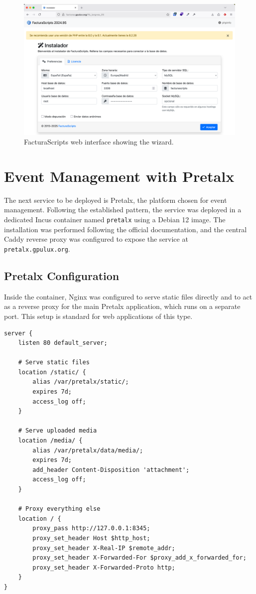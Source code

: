 \begin{figure}[H]
	\centering
	\includegraphics[width=\textwidth]{imaxes/facturascripts-wizard.png}
	\caption{FacturaScripts web interface showing the wizard.}
	\label{fig:facturascripts-wizard}
\end{figure}

\section{Event Management with Pretalx}

The next service to be deployed is Pretalx, the platform chosen for event management. Following the established pattern, the service was deployed in a dedicated Incus container named \texttt{pretalx} using a Debian 12 image. The installation was performed following the official documentation\cite{pretalx-install}, and the central Caddy reverse proxy was configured to expose the service at \texttt{pretalx.gpulux.org}.

\subsection*{Pretalx Configuration}

Inside the container, Nginx was configured to serve static files directly and to act as a reverse proxy for the main Pretalx application, which runs on a separate port. This setup is standard for web applications of this type.

\begin{lstlisting}[caption={Pretalx Nginx configuration to proxy the application and serve static files.}]
server {
    listen 80 default_server;

    # Serve static files
    location /static/ {
        alias /var/pretalx/static/;
        expires 7d;
        access_log off;
    }

    # Serve uploaded media
    location /media/ {
        alias /var/pretalx/data/media/;
        expires 7d;
        add_header Content-Disposition 'attachment';
        access_log off;
    }

    # Proxy everything else
    location / {
        proxy_pass http://127.0.0.1:8345;
        proxy_set_header Host $http_host;
        proxy_set_header X-Real-IP $remote_addr;
        proxy_set_header X-Forwarded-For $proxy_add_x_forwarded_for;
        proxy_set_header X-Forwarded-Proto http;
    }
}
\end{lstlisting}

